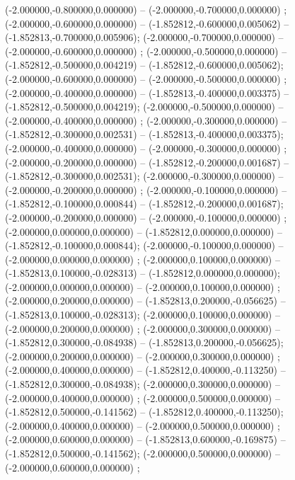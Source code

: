  (-2.000000,-0.800000,0.000000) -- (-2.000000,-0.700000,0.000000) ;
 (-2.000000,-0.600000,0.000000) -- (-1.852812,-0.600000,0.005062) -- (-1.852813,-0.700000,0.005906);
 (-2.000000,-0.700000,0.000000) -- (-2.000000,-0.600000,0.000000) ;
 (-2.000000,-0.500000,0.000000) -- (-1.852812,-0.500000,0.004219) -- (-1.852812,-0.600000,0.005062);
 (-2.000000,-0.600000,0.000000) -- (-2.000000,-0.500000,0.000000) ;
 (-2.000000,-0.400000,0.000000) -- (-1.852813,-0.400000,0.003375) -- (-1.852812,-0.500000,0.004219);
 (-2.000000,-0.500000,0.000000) -- (-2.000000,-0.400000,0.000000) ;
 (-2.000000,-0.300000,0.000000) -- (-1.852812,-0.300000,0.002531) -- (-1.852813,-0.400000,0.003375);
 (-2.000000,-0.400000,0.000000) -- (-2.000000,-0.300000,0.000000) ;
 (-2.000000,-0.200000,0.000000) -- (-1.852812,-0.200000,0.001687) -- (-1.852812,-0.300000,0.002531);
 (-2.000000,-0.300000,0.000000) -- (-2.000000,-0.200000,0.000000) ;
 (-2.000000,-0.100000,0.000000) -- (-1.852812,-0.100000,0.000844) -- (-1.852812,-0.200000,0.001687);
 (-2.000000,-0.200000,0.000000) -- (-2.000000,-0.100000,0.000000) ;
 (-2.000000,0.000000,0.000000) -- (-1.852812,0.000000,0.000000) -- (-1.852812,-0.100000,0.000844);
 (-2.000000,-0.100000,0.000000) -- (-2.000000,0.000000,0.000000) ;
 (-2.000000,0.100000,0.000000) -- (-1.852813,0.100000,-0.028313) -- (-1.852812,0.000000,0.000000);
 (-2.000000,0.000000,0.000000) -- (-2.000000,0.100000,0.000000) ;
 (-2.000000,0.200000,0.000000) -- (-1.852813,0.200000,-0.056625) -- (-1.852813,0.100000,-0.028313);
 (-2.000000,0.100000,0.000000) -- (-2.000000,0.200000,0.000000) ;
 (-2.000000,0.300000,0.000000) -- (-1.852812,0.300000,-0.084938) -- (-1.852813,0.200000,-0.056625);
 (-2.000000,0.200000,0.000000) -- (-2.000000,0.300000,0.000000) ;
 (-2.000000,0.400000,0.000000) -- (-1.852812,0.400000,-0.113250) -- (-1.852812,0.300000,-0.084938);
 (-2.000000,0.300000,0.000000) -- (-2.000000,0.400000,0.000000) ;
 (-2.000000,0.500000,0.000000) -- (-1.852812,0.500000,-0.141562) -- (-1.852812,0.400000,-0.113250);
 (-2.000000,0.400000,0.000000) -- (-2.000000,0.500000,0.000000) ;
 (-2.000000,0.600000,0.000000) -- (-1.852813,0.600000,-0.169875) -- (-1.852812,0.500000,-0.141562);
 (-2.000000,0.500000,0.000000) -- (-2.000000,0.600000,0.000000) ;
